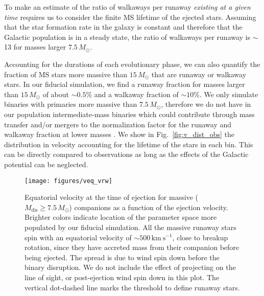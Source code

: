 \documentclass{aa}
\DeclareRobustCommand{\Figref}[1]{Fig.~\ref{#1}}
\begin{document}
To make an estimate of the
ratio of walkaways  per runaway {\it existing at a given time}
requires us to
consider the finite MS lifetime of the ejected stars. Assuming that the star formation rate in the galaxy is
constant and therefore that the Galactic population is in a steady state,
the ratio of walkaways per runaway is
$\sim$13 for masses larger $7.5\,M_\odot$.

Accounting for the durations of each evolutionary phase, we can also
quantify the fraction of MS stars more massive than $15\,M_\odot$ that are
runaway or walkaway stars. In our fiducial simulation, we find a
runaway fraction for masses larger than $15\,M_\odot$ of about $\sim$$0.5\%$ and a
walkaway fraction of $\sim$$10\%$. We only simulate binaries with primaries more
massive than $7.5\,M_\odot$, therefore we do not have in our
population intermediate-mass binaries which could contribute through
mass transfer and/or mergers  to the
normalization factor for the runaway and walkaway fraction at lower
masses \citep[][]{zapartas:17}. We show in \Figref{fig:v_dist_obs} the distribution in
velocity accounting for the lifetime of the stars in each bin. This
can be directly compared to observations as long as the effects of the
Galactic potential can be neglected.

\begin{figure*}[!htbp]
  \centering
  \texttt{[image: figures/veq\_vrw]}
  \caption{Equatorial velocity at the time of ejection for massive ($M_\mathrm{dis}\geq7.5\,M_\odot$) companions as a function
    of the ejection velocity. Brighter colors indicate location of the
    parameter space more populated by our fiducial simulation. All the massive runaway stars spin with
    an equatorial velocity of $\sim$$500\,\mathrm{km\ s^{-1}}$, close to
  breakup rotation, since they have accreted mass from their companion
  before being ejected. The spread is due to wind spin down before the
  binary disruption. We do not include the effect of projecting on
  the line of sight, or post-ejection wind spin down in this
  plot.  The
    vertical dot-dashed line marks the threshold to define runaway
    stars.}
  \label{fig:vrot_vrw}
\end{figure*}
\end{document}
